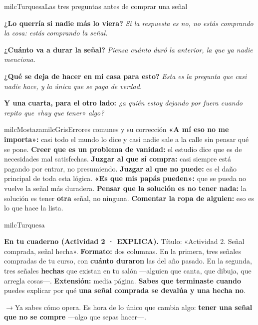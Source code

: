 \documentclass[11pt,letterpaper]{article}
\newcommand{\puente}[1]{%
  \begin{puentebox}%
    \textcolor{milcGradeDark}{$\rightarrow$}\hspace{2mm}#1%
  \end{puentebox}%
}
\begin{document}
\begin{drawbox}{milcTurquesa}{Las tres preguntas antes de comprar una señal}
\begin{pasoslista}
\item \textbf{¿Lo querría si nadie más lo viera?} \emph{Si la respuesta es no, no estás comprando la cosa: estás comprando la señal.}
\item \textbf{¿Cuánto va a durar la señal?} \emph{Piensa cuánto duró la anterior, la que ya nadie menciona.}
\item \textbf{¿Qué se deja de hacer en mi casa para esto?} \emph{Esta es la pregunta que casi nadie hace, y la única que se paga de verdad.}
\item \textbf{Y una cuarta, para el otro lado:} \emph{¿a quién estoy dejando por fuera cuando repito que «hay que tener» algo?}
\end{pasoslista}
\end{drawbox}

\begin{softbox}{milcMostaza}{milcGris}{Errores comunes y su corrección}
\textbf{«A mí eso no me importa»:} casi todo el mundo lo dice y casi nadie sale a la calle sin pensar qué se pone. \textbf{Creer que es un problema de vanidad:} el estudio dice que es de necesidades mal satisfechas. \textbf{Juzgar al que sí compra:} casi siempre está pagando por entrar, no presumiendo. \textbf{Juzgar al que no puede:} es el daño principal de toda esta lógica. \textbf{«Es que mis papás pueden»:} que se pueda no vuelve la señal más duradera. \textbf{Pensar que la solución es no tener nada:} la solución es tener \textbf{otra} señal, no ninguna. \textbf{Comentar la ropa de alguien:} eso es lo que hace la lista.
\end{softbox}

\begin{infoband}{milcTurquesa}


\textbf{En tu cuaderno (Actividad 2 · EXPLICA).} Título: «Actividad 2. Señal comprada, señal hecha». \textbf{Formato:} dos columnas. En la primera, tres señales compradas de tu curso, con \textbf{cuánto duraron} las del año pasado. En la segunda, tres señales \textbf{hechas} que existan en tu salón ---alguien que canta, que dibuja, que arregla cosas---. \textbf{Extensión:} media página. \textbf{Sabes que terminaste cuando} puedes explicar por qué \textbf{una señal comprada se devalúa y una hecha no}.
\end{infoband}

\puente{Ya sabes cómo opera. Es hora de lo único que cambia algo: \textbf{tener una señal que no se compre} ---algo que sepas hacer---.}
\end{document}
